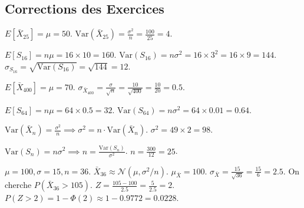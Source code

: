 
\subsection{Corrections des Exercices}

\begin{correctionbox}
$E[\bar{X}_{25}] = \mu = 50$.
$\text{Var}(\bar{X}_{25}) = \frac{\sigma^2}{n} = \frac{100}{25} = 4$.
\end{correctionbox}

\begin{correctionbox}
$E[S_{16}] = n\mu = 16 \times 10 = 160$.
$\text{Var}(S_{16}) = n\sigma^2 = 16 \times 3^2 = 16 \times 9 = 144$.
$\sigma_{S_{16}} = \sqrt{\text{Var}(S_{16})} = \sqrt{144} = 12$.
\end{correctionbox}

\begin{correctionbox}
$E[\bar{X}_{400}] = \mu = 70$.
$\sigma_{\bar{X}_{400}} = \frac{\sigma}{\sqrt{n}} = \frac{10}{\sqrt{400}} = \frac{10}{20} = 0.5$.
\end{correctionbox}

\begin{correctionbox}
$E[S_{64}] = n\mu = 64 \times 0.5 = 32$.
$\text{Var}(S_{64}) = n\sigma^2 = 64 \times 0.01 = 0.64$.
\end{correctionbox}

\begin{correctionbox}
$\text{Var}(\bar{X}_n) = \frac{\sigma^2}{n} \implies \sigma^2 = n \cdot \text{Var}(\bar{X}_n)$.
$\sigma^2 = 49 \times 2 = 98$.
\end{correctionbox}

\begin{correctionbox}
$\text{Var}(S_n) = n\sigma^2 \implies n = \frac{\text{Var}(S_n)}{\sigma^2}$.
$n = \frac{300}{12} = 25$.
\end{correctionbox}

\begin{correctionbox}
$\mu=100, \sigma=15, n=36$. $\bar{X}_{36} \approx \mathcal{N}(\mu, \sigma^2/n)$.
$\mu_{\bar{X}} = 100$. $\sigma_{\bar{X}} = \frac{15}{\sqrt{36}} = \frac{15}{6} = 2.5$.
On cherche $P(\bar{X}_{36} > 105)$.
$Z = \frac{105 - 100}{2.5} = \frac{5}{2.5} = 2$.
$P(Z > 2) = 1 - \Phi(2) \approx 1 - 0.9772 = 0.0228$.
\end{correctionbox}

